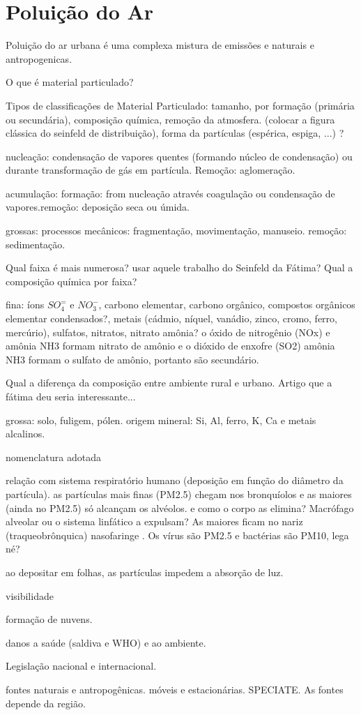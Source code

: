 \section{Poluição do Ar}

Poluição do ar urbana é uma complexa mistura de emissões e naturais e 
antropogenicas.  

O que é material particulado?

Tipos de classificações de Material Particulado: tamanho, por formação 
(primária ou secundária), 
composição química, remoção da atmosfera. (colocar a figura clássica do seinfeld de distribuição), forma da partículas (espérica, espiga, ...) ?

nucleação: condensação de vapores quentes (formando núcleo de condensação) ou durante transformação de gás em partícula. Remoção: aglomeração. 

acumulação: formação: from nucleação através coagulação ou condensação de vapores.remoção: deposição seca ou úmida.

grossas: processos mecânicos: fragmentação, movimentação, manuseio. remoção: sedimentação.

Qual faixa é mais numerosa? usar aquele trabalho do Seinfeld da Fátima?
Qual a composição química por faixa?

fina: íons $SO_4^=$ e $ NO_3^-$, carbono elementar, carbono orgânico, compostos orgânicos elementar condensados?, metais (cádmio, níquel, vanádio, zinco, cromo, ferro, mercúrio), sulfatos, nitratos, nitrato amônia?  
o óxido de nitrogênio (NOx) e amônia NH3 formam  nitrato de amônio e 
o dióxido de enxofre (SO2) amônia NH3 formam o sulfato de amônio, portanto são secundário. 

Qual a diferença da composição entre ambiente rural e urbano.
Artigo que a fátima deu seria interessante... 

grossa: solo, fuligem, pólen. origem mineral: Si, Al, ferro, K, Ca e metais alcalinos.

nomenclatura adotada

relação com sistema respiratório humano (deposição em função do diâmetro da partícula).
as partículas mais finas (PM2.5) chegam nos bronquíolos e as maiores (ainda no PM2.5) só alcançam os alvéolos. e como o corpo as elimina? Macrófago alveolar ou o sistema linfático a expulsam? 
As maiores ficam no nariz (traqueobrônquica) nasofaringe . 
Os vírus são PM2.5 e bactérias são PM10, lega né?

ao depositar em folhas, as partículas impedem a absorção de luz. 


visibilidade

formação de nuvens.

danos a saúde (saldiva e WHO) e ao ambiente.

Legislação nacional e internacional.

fontes naturais e antropogênicas. 
móveis e estacionárias. SPECIATE. As fontes depende da região.

